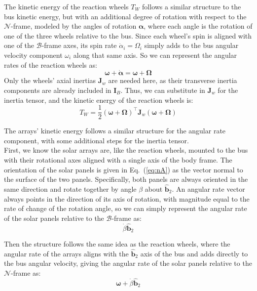 \documentclass[titlepage]{article}
\begin{document}
\begin{mdframed}[linewidth=1pt, innertopmargin=10pt, innerbottommargin=10pt]
	The kinetic energy of the reaction wheels $T_W$ follows a similar structure to the bus kinetic energy, but with an additional degree of rotation with respect to the $\mathcal{N}$-frame, modeled by the angles of rotation $\boldsymbol{\alpha}$, where each angle is the rotation of one of the three wheels relative to the bus. Since each wheel's spin is aligned with one of the $\mathcal{B}$-frame axes, its spin rate $\dot{\alpha}_i=\Omega_i$ simply adds to the bus angular velocity component $\omega_i$ along that same axis. So we can represent the angular rates of the reaction wheels as:
	\begin{equation}
		\boldsymbol{\omega}+\dot{\boldsymbol{\alpha}}=\boldsymbol{\omega}+\boldsymbol{\Omega}
	\end{equation}
	Only the wheels' axial inertias $\boldsymbol{J}_w$ are needed here, as their transverse inertia components are already included in $\boldsymbol{I}_B$. Thus, we can substitute in $\boldsymbol{J}_w$ for the inertia tensor, and the kinetic energy of the reaction wheels is:
	\begin{equation}
		T_W=\frac{1}{2}(\boldsymbol{\omega}+\boldsymbol{\Omega})^\top\boldsymbol{J}_w(\boldsymbol{\omega}+\boldsymbol{\Omega})
	\end{equation}
\end{mdframed}

The arrays' kinetic energy follows a similar structure for the angular rate component, with some additional steps for the inertia tensor.\\

First, we know the solar arrays are, like the reaction wheels, mounted to the bus with their rotational axes aligned with a single axis of the body frame. The orientation of the solar panels is given in Eq.~(\ref{eq:nA}) as the vector normal to the surface of the two panels. Specifically, both panels are always oriented in the same direction and rotate together by angle $\beta$ about $\hat{\boldsymbol{b}}_2$. An angular rate vector always points in the direction of its axis of rotation, with magnitude equal to the rate of change of the rotation angle, so we can simply represent the angular rate of the solar panels relative to the $\mathcal{B}$-frame as:
\begin{equation}
	\dot{\beta}\hat{\boldsymbol{b}}_2
\end{equation}

Then the structure follows the same idea as the reaction wheels, where the angular rate of the arrays aligns with the $\hat{\boldsymbol{b}}_2$ axis of the bus and adds directly to the bus angular velocity, giving the angular rate of the solar panels relative to the $\mathcal{N}$-frame as:
\begin{equation}
	\boldsymbol{\omega}+\dot{\beta}\hat{\boldsymbol{b}}_2
	\label{eq:omegaA}
\end{equation}
\end{document}

